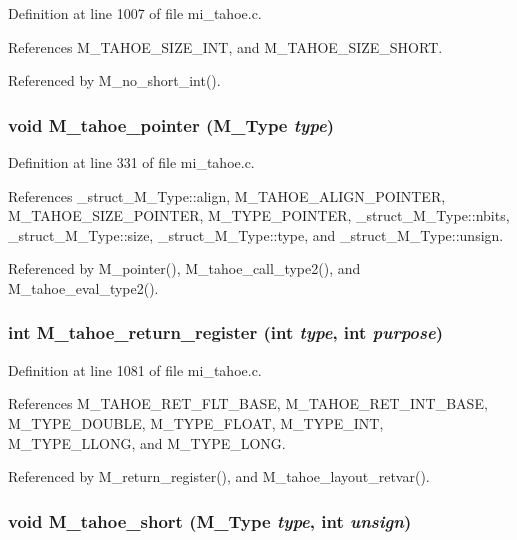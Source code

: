 Definition at line 1007 of file mi\_\-tahoe.c.

References M\_\-TAHOE\_\-SIZE\_\-INT, and M\_\-TAHOE\_\-SIZE\_\-SHORT.

Referenced by M\_\-no\_\-short\_\-int().
\subsubsection{\setlength{\rightskip}{0pt plus 5cm}void M\_\-tahoe\_\-pointer (\bf{M\_\-Type} {\em type})}\label{m__tahoe_8h_431c118d6346f0cda63defbdf30c303d}




Definition at line 331 of file mi\_\-tahoe.c.

References \_\-struct\_\-M\_\-Type::align, M\_\-TAHOE\_\-ALIGN\_\-POINTER, M\_\-TAHOE\_\-SIZE\_\-POINTER, M\_\-TYPE\_\-POINTER, \_\-struct\_\-M\_\-Type::nbits, \_\-struct\_\-M\_\-Type::size, \_\-struct\_\-M\_\-Type::type, and \_\-struct\_\-M\_\-Type::unsign.

Referenced by M\_\-pointer(), M\_\-tahoe\_\-call\_\-type2(), and M\_\-tahoe\_\-eval\_\-type2().
\subsubsection{\setlength{\rightskip}{0pt plus 5cm}int M\_\-tahoe\_\-return\_\-register (int {\em type}, int {\em purpose})}\label{m__tahoe_8h_90c637e6c9975a5a0d566cd3b8033dbd}




Definition at line 1081 of file mi\_\-tahoe.c.

References M\_\-TAHOE\_\-RET\_\-FLT\_\-BASE, M\_\-TAHOE\_\-RET\_\-INT\_\-BASE, M\_\-TYPE\_\-DOUBLE, M\_\-TYPE\_\-FLOAT, M\_\-TYPE\_\-INT, M\_\-TYPE\_\-LLONG, and M\_\-TYPE\_\-LONG.

Referenced by M\_\-return\_\-register(), and M\_\-tahoe\_\-layout\_\-retvar().
\subsubsection{\setlength{\rightskip}{0pt plus 5cm}void M\_\-tahoe\_\-short (\bf{M\_\-Type} {\em type}, int {\em unsign})}\label{m__tahoe_8h_956cdcd052d1c400b571918e4d4755c7}




